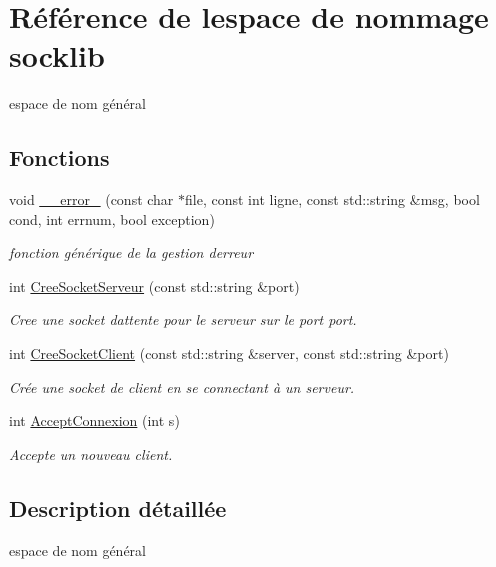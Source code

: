 \hypertarget{namespacesocklib}{}\section{Référence de l\textquotesingle{}espace de nommage socklib}
\label{namespacesocklib}


espace de nom général  


\subsection*{Fonctions}
\begin{DoxyCompactItemize}
\item 
void \mbox{\hyperlink{namespacesocklib_aec23e1a0b60ca039283516d2305f799e}{\+\_\+\+\_\+error\+\_\+}} (const char $\ast$file, const int ligne, const std\+::string \&msg, bool cond, int errnum, bool exception)
\begin{DoxyCompactList}\small\item\em fonction générique de la gestion d\textquotesingle{}erreur \end{DoxyCompactList}\item 
int \mbox{\hyperlink{namespacesocklib_af229dcfe18deb451a8163a02ea5a3b06}{Cree\+Socket\+Serveur}} (const std\+::string \&port)
\begin{DoxyCompactList}\small\item\em Cree une socket d\textquotesingle{}attente pour le serveur sur le port \textquotesingle{}\textquotesingle{}port\textquotesingle{}\textquotesingle{}. \end{DoxyCompactList}\item 
int \mbox{\hyperlink{namespacesocklib_a426a4d6e2fbcf559659e88607f0473f7}{Cree\+Socket\+Client}} (const std\+::string \&server, const std\+::string \&port)
\begin{DoxyCompactList}\small\item\em Crée une socket de client en se connectant à un serveur. \end{DoxyCompactList}\item 
int \mbox{\hyperlink{namespacesocklib_a56cdbced316496706a18df3f6a62d28f}{Accept\+Connexion}} (int s)
\begin{DoxyCompactList}\small\item\em Accepte un nouveau client. \end{DoxyCompactList}\end{DoxyCompactItemize}


\subsection{Description détaillée}
espace de nom général 

